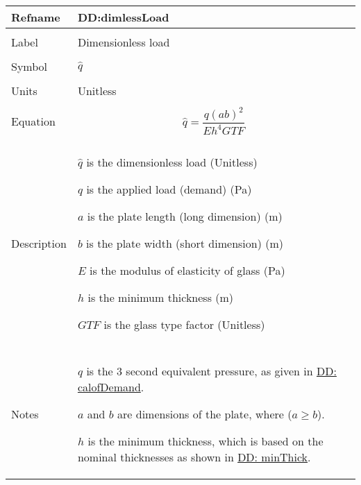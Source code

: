 \documentclass[12pt]{article}
\begin{document}
\vspace{\baselineskip}
\noindent
\begin{minipage}{\textwidth}
\begin{tabular}{>{\raggedright}p{}>{\raggedright\arraybackslash}p{}}
\toprule \textbf{Refname} & \textbf{DD:dimlessLoad}
\label{DD:dimlessLoad}
\\ \midrule \\
Label & Dimensionless load
        
\\ \midrule \\
Symbol & $\hat{q}$
         
\\ \midrule \\
Units & Unitless
        
\\ \midrule \\
Equation & \begin{displaymath}
           \hat{q}=\frac{q \left(a b\right)^{2}}{E h^{4} GTF}
           \end{displaymath}
\\ \midrule \\
Description & \begin{symbDescription}
              \item{$\hat{q}$ is the dimensionless load (Unitless)}
              \item{$q$ is the applied load (demand) (Pa)}
              \item{$a$ is the plate length (long dimension) (m)}
              \item{$b$ is the plate width (short dimension) (m)}
              \item{$E$ is the modulus of elasticity of glass (Pa)}
              \item{$h$ is the minimum thickness (m)}
              \item{$GTF$ is the glass type factor (Unitless)}
              \end{symbDescription}
\\ \midrule \\
Notes & $q$ is the 3 second equivalent pressure, as given in \hyperref[DD:calofDemand]{DD: calofDemand}.
        
        $a$ and $b$ are dimensions of the plate, where ($a\geq{}b$).
        
        $h$ is the minimum thickness, which is based on the nominal thicknesses as shown in \hyperref[DD:minThick]{DD: minThick}.
        

\end{tabular}
\end{minipage}
\end{document}
